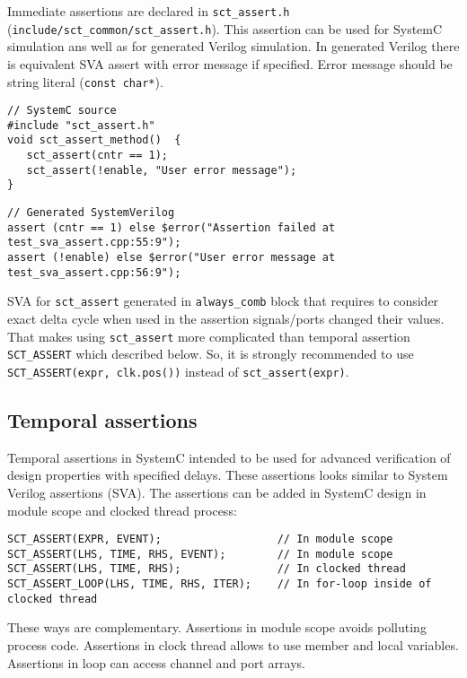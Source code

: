 Immediate assertions are declared in {\tt sct\_assert.h} ({\tt include/sct\_common/sct\_assert.h}). This assertion can be used for SystemC simulation ans well as for generated Verilog simulation. In generated Verilog there is equivalent SVA assert with error message if specified. Error message should be string literal ({\tt const char*}).

\begin{lstlisting}[style=mycpp]
// SystemC source
#include "sct_assert.h"
void sct_assert_method()  {
   sct_assert(cntr == 1);
   sct_assert(!enable, "User error message");
}
\end{lstlisting}
%
\begin{lstlisting}[style=myverilog]
// Generated SystemVerilog
assert (cntr == 1) else $error("Assertion failed at test_sva_assert.cpp:55:9");
assert (!enable) else $error("User error message at test_sva_assert.cpp:56:9");
\end{lstlisting}

SVA for {\tt sct\_assert} generated in {\tt always\_comb} block that requires to consider exact delta cycle when used in the assertion signals/ports changed their values. That makes using {\tt sct\_assert} more complicated than temporal assertion {\tt SCT\_ASSERT} which described below. So, it is strongly recommended to use {\tt SCT\_ASSERT(expr, clk.pos())} instead of {\tt sct\_assert(expr)}.

\subsection{Temporal assertions}

Temporal assertions in SystemC intended to be used for advanced verification of design properties with specified delays. These assertions looks similar to System Verilog assertions (SVA). The assertions can be added in SystemC design in module scope and clocked thread process:

\begin{lstlisting}[style=mycpp]
SCT_ASSERT(EXPR, EVENT);                  // In module scope 
SCT_ASSERT(LHS, TIME, RHS, EVENT);        // In module scope 
SCT_ASSERT(LHS, TIME, RHS);               // In clocked thread 
SCT_ASSERT_LOOP(LHS, TIME, RHS, ITER);    // In for-loop inside of clocked thread
\end{lstlisting}

These ways are complementary. Assertions in module scope avoids polluting process code. Assertions in clock thread allows to use member and local variables. Assertions in loop can access channel and port arrays.

